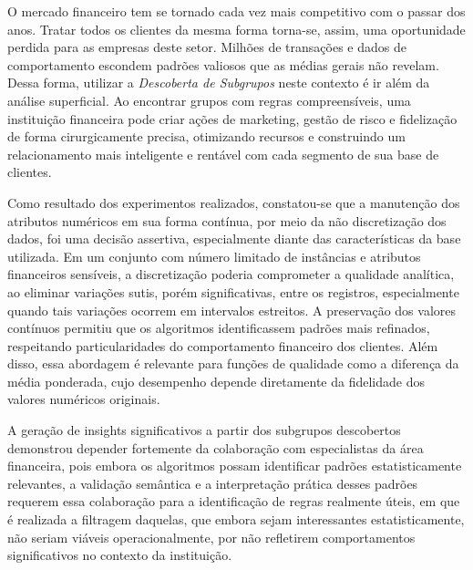 \documentclass[12pt]{article}
\begin{document}
\hspace{1.2cm}O mercado financeiro tem se tornado cada vez mais competitivo com o passar dos anos. Tratar todos os clientes da mesma forma torna-se, assim, uma oportunidade perdida para as empresas deste setor. Milhões de transações e dados de comportamento escondem padrões valiosos que as médias gerais não revelam. Dessa forma, utilizar a \textit{Descoberta de Subgrupos} neste contexto é ir além da análise superficial. Ao encontrar grupos com regras compreensíveis, uma instituição financeira pode criar ações de marketing, gestão de risco e fidelização de forma cirurgicamente precisa, otimizando recursos e construindo um relacionamento mais inteligente e rentável com cada segmento de sua base de clientes.

Como resultado dos experimentos realizados, constatou-se que a manutenção dos atributos numéricos em sua forma contínua, por meio da não discretização dos dados, foi uma decisão assertiva, especialmente diante das características da base utilizada. Em um conjunto com número limitado de instâncias e atributos financeiros sensíveis, a discretização poderia comprometer a qualidade analítica, ao eliminar variações sutis, porém significativas, entre os registros, especialmente quando tais variações ocorrem em intervalos estreitos. A preservação dos valores contínuos permitiu que os algoritmos identificassem padrões mais refinados, respeitando particularidades do comportamento financeiro dos clientes. Além disso, essa abordagem é relevante para funções de qualidade como a diferença da média ponderada, cujo desempenho depende diretamente da fidelidade dos valores numéricos originais.

A geração de insights significativos a partir dos subgrupos descobertos demonstrou depender fortemente da colaboração com especialistas da área financeira, pois embora os algoritmos possam identificar padrões estatisticamente relevantes, a validação semântica e a interpretação prática desses padrões requerem essa colaboração para a identificação de regras realmente úteis, em que é realizada a filtragem daquelas, que embora sejam interessantes estatisticamente, não seriam viáveis operacionalmente, por não refletirem comportamentos significativos no contexto da instituição.



\end{document}
